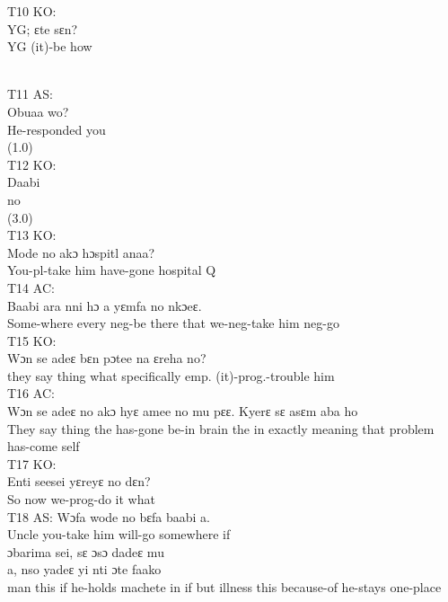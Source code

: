 \documentclass[output=paper,colorlinks,citecolor=brown]{langscibook}
\begin{document}

\ea
    T10 KO:\\
    \gll    YG; ɛte sɛn? \\
            YG (it)-be how \\
\z

\\

\ea
    T11 AS:\\
    \gll    Obuaa wo?\\
            He-responded you\\
            (1.0)\\
\ex
    T12 KO:\\
    \gll    Daabi \\
            no \\
            (3.0)\\
\ex
    T13 KO:\\
    \gll    Mode no akɔ hɔspitl anaa? \\
            You-pl-take him have-gone hospital Q \\
\ex
    T14 AC:\\
    \gll    Baabi ara nni hɔ a yɛmfa no nkɔeɛ. \\
            Some-where every neg-be there that we-neg-take him neg-go \\
\ex
    T15 KO:\\
    \gll    Wɔn se adeɛ bɛn pɔtee na ɛreha no? \\
            they say thing what specifically emp. (it)-prog.-trouble him \\
\ex
    T16 AC:\\
    \gll    Wɔn se adeɛ no akɔ hyɛ amee no mu pɛɛ. Kyerɛ sɛ asɛm aba ho \\
            They say thing the has-gone be-in brain the in exactly meaning that problem has-come self \\
\ex
    T17 KO:\\
    \gll    Enti seesei yɛreyɛ no dɛn? \\
            So now we-prog-do it what \\
\ex
    T18 AS:
    \ea 
    \gll    Wɔfa wode no bɛfa baabi a. \\
            Uncle you-take him will-go somewhere if \\
    \ex
    \gll    ɔbarima sei, sɛ ɔsɔ dadeɛ mu \\ a, nso yadeɛ yi nti ɔte faako\\
            man this if he-holds machete in if but illness this because-of he-stays one-place \\
\end{document}
